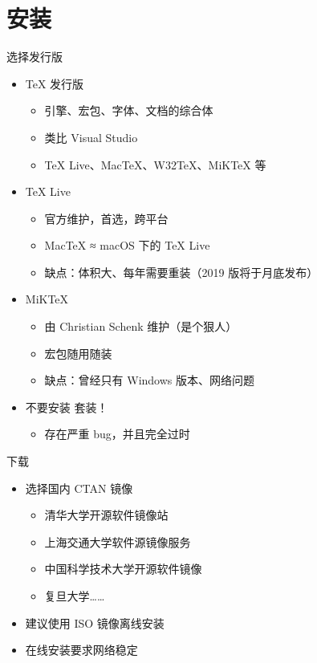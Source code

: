 \section{安装}

\begin{frame}{选择发行版}
\begin{itemize}
  \item \TeX{} 发行版
    \begin{itemize}
      \item 引擎、宏包、字体、文档的综合体
      \item 类比 Visual Studio
      \item \TeX{} Live、Mac\TeX{}、W32\TeX{}、MiK\TeX{} 等
    \end{itemize} \pause
  \item \TeX{} Live 
    \begin{itemize}
      \item 官方维护，首选，跨平台
      \item Mac\TeX{} ≈ macOS 下的 \TeX{} Live
      \item 缺点：体积大、每年需要重装（2019 版将于月底发布）
    \end{itemize}
  \item MiK\TeX{} 
    \begin{itemize}
      \item 由 Christian Schenk 维护（是个狠人）
      \item 宏包随用随装
      \item 缺点：曾经只有 Windows 版本、网络问题
    \end{itemize} \pause
  \item \alert{不要安装 \CTeX{} 套装！}
    \begin{itemize}
      \item \alert{存在严重 bug，并且完全过时}
    \end{itemize}
\end{itemize}
\end{frame}

\begin{frame}{下载}
\begin{itemize}
  \item 选择国内 CTAN 镜像
    \begin{itemize}
      \item 清华大学开源软件镜像站 
      \item 上海交通大学软件源镜像服务 
      \item 中国科学技术大学开源软件镜像  \pause
      \item 复旦大学……
    \end{itemize} \pause
  \item 建议使用 ISO 镜像离线安装
  \item 在线安装要求网络稳定
\end{itemize}
\end{frame}

